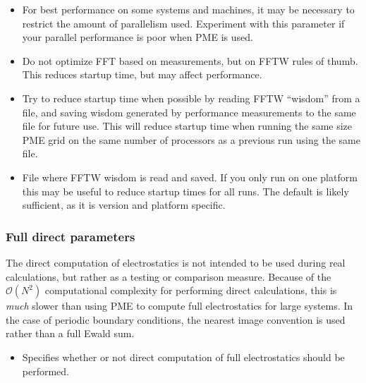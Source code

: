 \begin{itemize}
\item
{}
{For best performance on some systems and machines, it may be necessary to
restrict the amount of parallelism used.  Experiment with this parameter if
your parallel performance is poor when PME is used.}

\item
{}
{Do not optimize FFT based on measurements, but on FFTW rules of thumb.
This reduces startup time, but may affect performance.}

\item
{}
{Try to reduce startup time when possible by reading FFTW ``wisdom'' from a file, and saving wisdom generated by performance measurements to the same file for future use.
This will reduce startup time when running the same size PME grid on the same number of processors as a previous run using the same file.}

\item
{}
{File where FFTW wisdom is read and saved.
If you only run on one platform this may be useful to reduce startup times for all runs.
The default is likely sufficient, as it is version and platform specific.}

\end{itemize}

\subsubsection{Full direct parameters}

The direct computation of electrostatics 
is not intended to be used during 
real calculations, but rather as a testing or 
comparison measure.  Because of the ${\mathcal O}(N^2)$ 
computational complexity for performing 
direct calculations, this is {\it much} 
slower than using PME to compute full 
electrostatics for large systems.
In the case of periodic boundary conditions,
the nearest image convention is used rather than a
full Ewald sum.

\begin{itemize}

\item
{}
{Specifies whether or not direct computation of 
full electrostatics should be performed.}

\end{itemize}


